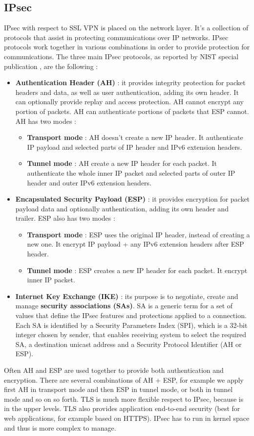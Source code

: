 \documentclass[11pt]{article}
\begin{document}
\subsection{IPsec}
IPsec with respect to SSL VPN is placed on the network layer. It's a collection of protocols that assist in protecting communications over IP networks. IPsec protocols work together in various combinations in order to provide protection for communications. The three main IPsec protocols, as reported by NIST special publication \cite{ipsec_vpn}, are the following :
\begin{itemize}
\item \textbf{Authentication Header (AH)} : it provides integrity protection for packet headers and data, as well as user authentication, adding its own header. It can optionally provide replay and access protection. AH cannot encrypt any portion of packets. AH can authenticate portions of packets that ESP cannot. AH has two modes :
\begin{itemize}
\item \textbf{Transport mode} : AH doesn't create a new IP header. It authenticate IP payload and selected parts of IP header and IPv6 extension headers.
\item \textbf{Tunnel mode} : AH create a new IP header for each packet. It authenticate the whole inner IP packet and selected parts of outer IP header and outer IPv6 extension headers. 
\end{itemize}
\item \textbf{Encapsulated Security Payload (ESP)} : it provides encryption for packet payload data and optionally authentication, adding its own header and trailer. ESP also has two modes : 
\begin{itemize}
\item \textbf{Transport mode} : ESP uses the original IP header, instead of creating a new one. It encrypt IP payload + any IPv6 extension headers after ESP header.
\item \textbf{Tunnel mode} : ESP creates a new IP header for each packet. It encrypt inner IP packet.
\end{itemize}
\item \textbf{Internet Key Exchange (IKE)} : its purpose is to negotiate, create and manage \textbf{security associations (SAs)}. SA is a generic term for a set of values that define the IPsec features and protections applied to a connection. Each SA is identified by a Security Parameters Index (SPI), which is a 32-bit integer chosen by sender, that enables receiving system to select the required SA, a destination unicast address and a Security Protocol Identifier (AH or ESP).
\end{itemize}
Often AH and ESP are used together to provide both authentication and encryption. There are several combinations of AH + ESP, for example we apply first AH in transport mode and then ESP in tunnel mode, or both in tunnel mode and so on so forth. TLS is much more flexible respect to IPsec, because is in the upper levels. TLS also provides application end-to-end security (best for web applications, for example based on HTTPS). IPsec has to run in kernel space and thus is more complex to manage.
\end{document}
